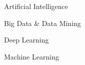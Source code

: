 \begin{cventries}
  \cventry
    {}
    {}
    {}
    {}
    {
      \begin{cvitems}
        \item {Artificial Intelligence}
        \item {Big Data \& Data Mining}
        \item {Deep Learning}
        \item {Machine Learning}
      \end{cvitems}
    }
\end{cventries}
